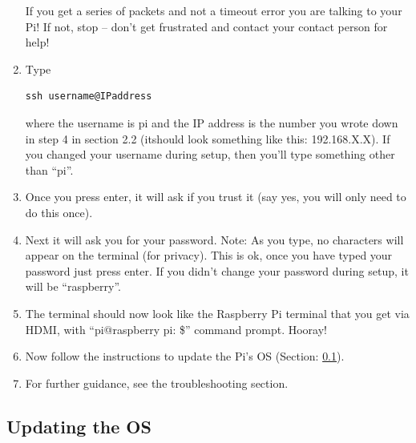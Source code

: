 \documentclass{article}\usepackage[]{graphicx}\usepackage[]{color}
\begin{document}
\begin{enumerate}
If you get a series of packets and not a timeout error you are talking to your Pi! If not, stop -- don't get frustrated and contact your contact person for help!

\item Type

\begin{lstlisting}
ssh username@IPaddress
\end{lstlisting}

where the username is pi and the IP address is the number you wrote down in step 4 in section 2.2 (itshould look something like this: 192.168.X.X). If you changed your username during setup, then you'll type something other than ``pi''.

\item Once you press enter, it will ask if you trust it (say yes, you will only need to do this once). 

\item Next it will ask you for your password.  Note: As you type, no characters will appear on the terminal (for privacy).  This is ok, once you have typed your password just press enter.  If you didn't change your password during setup, it will be ``raspberry''.

\item The terminal should now look like the Raspberry Pi terminal that you get via HDMI, with ``pi@raspberry pi: \$'' command prompt.  Hooray! 

\item Now follow the instructions to update the Pi's OS (Section: \ref{subsec:OS}).

\item For further guidance, see the troubleshooting section.

\end{enumerate}

\subsection{Updating the OS}\label{subsec:OS}
\end{document}
